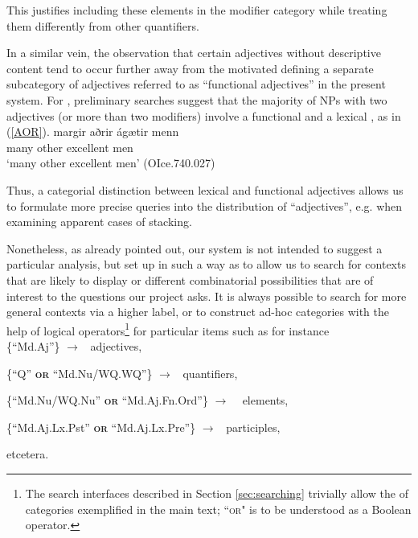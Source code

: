 \documentclass[output=paper,colorlinks,citecolor=brown]{langscibook}
\begin{document}
This justifies including these elements in the modifier category while treating them differently from other quantifiers. 

In a similar vein, the observation that certain adjectives without descriptive content tend to occur further away from the   motivated defining a separate subcategory of adjectives referred to as ``functional adjectives'' in the present system.  %
For , preliminary searches suggest that the majority of NPs with two adjectives (or more than two modifiers) involve a functional and a lexical , as in (\ref{AOR}).
\ea \label{AOR}  
    \gll margir aðrir ágætir menn\\
         many   other     excellent    men \\
    \glt `many other excellent men' 
    (OIce.740.027)
\z

Thus, a categorial distinction between lexical and functional adjectives allows us to formulate more precise queries into the distribution of ``adjectives'', e.g. when examining apparent cases of  stacking. 

Nonetheless, as already pointed out, our system is not intended to suggest a particular analysis, but set up in such a way as to allow us to search for contexts that are likely to display  or different combinatorial possibilities that are of interest to the questions our project asks. %
It is always possible to search for more general contexts via a higher label, or to construct ad-hoc categories with the help of logical operators\footnote{The search interfaces described in Section \ref{sec:searching} trivially allow the  of categories exemplified in the main text; ``\textsc{or}" is to be understood as a Boolean operator.} for particular items such as for instance  \\ 

\{``Md.Aj''\} \hfill $\rightarrow$ \ adjectives, 

\{``Q'' \textbf{\textsc{or}}  ``Md.Nu/WQ.WQ''\}  \hfill $\rightarrow$ \ quantifiers, 

 \{``Md.Nu/WQ.Nu'' \textbf{\textsc{or}} ``Md.Aj.Fn.Ord''\} \hfill $\rightarrow$ \  elements,

 \{``Md.Aj.Lx.Pst'' \textbf{\textsc{or}} ``Md.Aj.Lx.Pre''\} \hfill $\rightarrow$ \ participles, 

 etcetera.
\end{document}
